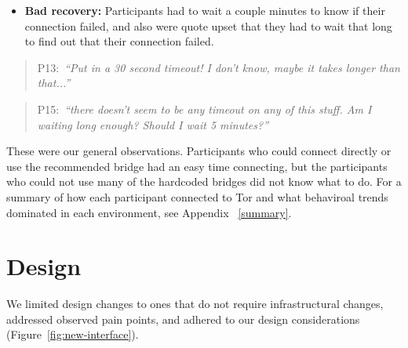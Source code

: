\documentclass[USenglish,oneside,twocolumn]{article}
\newcommand{\pquote}[2]{
\begin{quotation}
\noindent #1:~\textit{#2}
\end{quotation}
}
\begin{document}
\begin{itemize}
\item {\bfseries Bad recovery:} Participants had to wait a couple minutes to know if their connection failed, and also were quote upset that they had to wait that long to find out that their connection failed.
\end{itemize} 

\pquote{P13}{``Put in a 30 second timeout! I don't know, maybe it takes longer than that...''}

\pquote{P15}{``there doesn't seem to be any timeout on any of this stuff. Am I waiting long enough? Should I wait 5 minutes?''}

These were our general observations. Participants who could connect directly or use the recommended bridge had an easy time connecting, but the participants who could not use many of the hardcoded bridges did not know what to do. For a summary of how each participant connected to Tor and what behaviroal trends dominated in each environment, see Appendix ~\ref{summary}. 

\section{Design}
\label{sec:design} 

We limited design changes to ones that do not require infrastructural changes, addressed observed pain points, and adhered to our design considerations (Figure~\ref{fig:new-interface}). 
\end{document}
